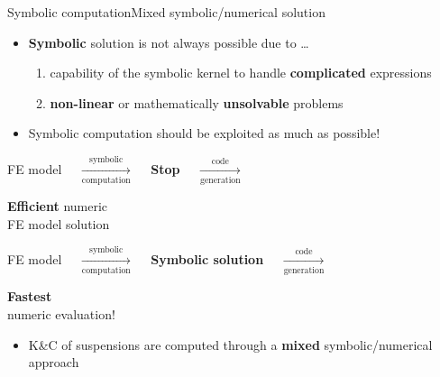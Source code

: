 \begin{frame}{Symbolic computation}{Mixed symbolic/numerical solution}
  \begin{itemize}
    \item \textbf{Symbolic} solution is not always possible due to \dots
    \begin{enumerate}
      \item capability of the symbolic kernel to handle \textbf{complicated} expressions
      \item \textbf{non-linear} or mathematically \textbf{unsolvable} problems
    \end{enumerate}
     \item Symbolic computation should be exploited as much as possible!
  \end{itemize}
  \begin{center}\begin{minipage}{1.0\textwidth}\begin{block}{}
    \centering
    FE model $\quad \xrightarrow[\text{computation}]{\text{symbolic}} \quad$ \hspace*{1.05cm}\textcolor{mycolor2}{\textbf{Stop}}\hspace*{1.05cm} $\quad \xrightarrow[\text{generation}]{\text{code}} \quad$ \begin{minipage}[c]{0.27\linewidth}\begin{center}{\textbf{Efficient} numeric \\ FE model solution}\end{center}\end{minipage}
  \end{block}\end{minipage}\end{center}
  \begin{center}\begin{minipage}{1.0\textwidth}\begin{block}{}
    \centering
    FE model $\quad \xrightarrow[\text{computation}]{\text{symbolic}} \quad$ \textcolor{mycolor5}{\textbf{Symbolic solution}} $\quad \xrightarrow[\text{generation}] {\text{code}} \quad$ \begin{minipage}[c]{0.27\linewidth}\begin{center}{\textbf{Fastest} \\ numeric evaluation!}\end{center}\end{minipage}
  \end{block}\end{minipage}\end{center}
  \begin{itemize}
    \item K\&C{} of suspensions are computed through a \textbf{mixed} symbolic/numerical approach
  \end{itemize}
\end{frame}


